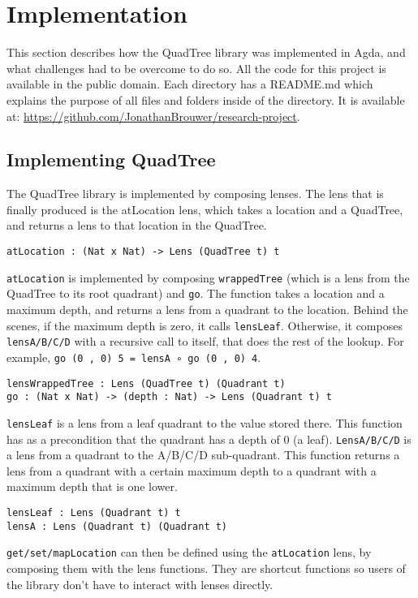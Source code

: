 \section{Implementation}
This section describes how the QuadTree library was implemented in Agda, and what challenges had to be overcome to do so. All the code for this project is available in the public domain. Each directory has a README.md which explains the purpose of all files and folders inside of the directory.
It is available at: \textcolor{blue}{\href{https://github.com/JonathanBrouwer/research-project}{https://github.com/JonathanBrouwer/research-project}}. 

\subsection{Implementing QuadTree}
The QuadTree library is implemented by composing lenses. The lens that is finally produced is the atLocation lens, which takes a location and a QuadTree, and returns a lens to that location in the QuadTree.
\begin{verbatim}
atLocation : (Nat x Nat) -> Lens (QuadTree t) t
\end{verbatim}
 \verb|atLocation| is implemented by composing \verb|wrappedTree| (which is a lens from the QuadTree to its root quadrant) and  \verb|go|.   The function takes a location and a maximum depth, and returns a lens from a quadrant to the location. Behind the scenes, if the maximum depth is zero, it calls  \verb|lensLeaf|. Otherwise, it composes  \verb|lensA/B/C/D| with a recursive call to itself, that does the rest of the lookup. For example, \verb|go (0 , 0) 5 = lensA ∘ go (0 , 0) 4|.
\begin{verbatim}
lensWrappedTree : Lens (QuadTree t) (Quadrant t)
go : (Nat x Nat) -> (depth : Nat) -> Lens (Quadrant t) t
\end{verbatim}
 \verb|lensLeaf| is a lens from a leaf quadrant to the value stored there. This function has as a precondition that the quadrant has a depth of 0 (a leaf).  \verb|LensA/B/C/D| is a lens from a quadrant to the A/B/C/D sub-quadrant. This function returns a lens from a quadrant with a certain maximum depth to a quadrant with a maximum depth that is one lower. 
\begin{verbatim}
lensLeaf : Lens (Quadrant t) t
lensA : Lens (Quadrant t) (Quadrant t)
\end{verbatim}
 \verb|get/set/mapLocation| can then be defined using the  \verb|atLocation| lens, by composing them with the lens functions. They are shortcut functions so users of the library don't have to interact with lenses directly.
